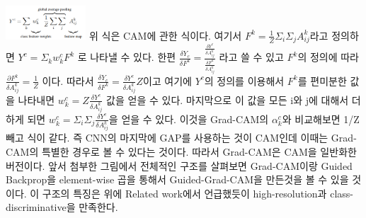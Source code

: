 \documentclass[extendedabs]{bmvc2k}
\begin{document}
 \newline  \includegraphics[width=3cm]{images/07_CAM.PNG}
 \newline 위 식은 CAM에 관한 식이다. 여기서 $F^k = \frac{1}{Z}\Sigma_i\Sigma_j A^k_{ij}$라고 정의하면 $Y^c = \Sigma_k w_k^c F^k $ 로 나타낼 수 있다.
 한편 $\frac{\delta Y_c}{\delta F^k}=\frac{\frac{\delta Y^c}{\delta A^k_{ij}}}{\frac{\delta F^k}{\delta A^k_{ij}}}$ 라고 쓸 수 있고 $F^k$의 정의에 따라 $\frac{∂F^k}{\delta A^k_{ij}}=\frac{1}{Z}$ 이다.
 따라서 $\frac{\delta Y_c}{\delta F^k}=\frac{\delta Y^c}{\delta A^k_{ij}}Z$이고 여기에 $Y^c$의 정의를 이용해서 $F^k$를 편미분한 값을 나타내면 $w_k^c=Z\frac{\delta Y^c}{\delta A^k_{ij}}$ 값을 얻을 수 있다.
 마지막으로 이 값을 모든 i와 j에 대해서 더하게 되면 $w_k^c=\Sigma_i \Sigma_j \frac{\delta Y^c}{\delta A^k_{ij}}$을 얻을 수 있다.
 이것을 Grad-CAM의 $\alpha_k^c$와 비교해보면 1/Z 빼고 식이 같다. 즉 CNN의 마지막에 GAP를 사용하는 것이 CAM인데 이때는 Grad-CAM의 특별한 경우로 볼 수 있다는 것이다.
 따라서 Grad-CAM은 CAM을 일반화한 버전이다.
 앞서 첨부한 그림에서 전체적인 구조를 살펴보면 Grad-CAM이랑 Guided Backprop을 element-wise 곱을 통해서 Guided-Grad-CAM을 만든것을 볼 수 있을 것이다. 이 구조의 특징은 위에 Related work에서 언급했듯이 
 high-resolution과 class-discriminative을 만족한다. 
 
\end{document}
